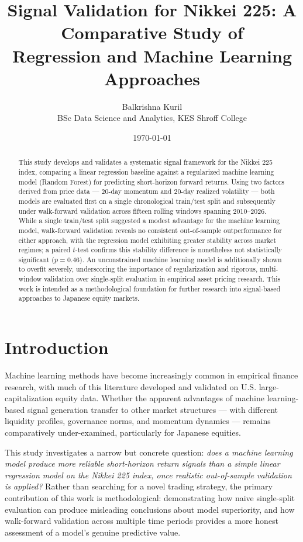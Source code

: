 \documentclass[11pt]{article}
\title{Signal Validation for Nikkei 225: A Comparative Study of \\ Regression and Machine Learning Approaches}
\author{Balkrishna Kuril \\ \small BSc Data Science and Analytics, KES Shroff College}
\date{\today}
\begin{document}
\maketitle

\begin{abstract}
This study develops and validates a systematic signal framework for the Nikkei 225 index, comparing a linear regression baseline against a regularized machine learning model (Random Forest) for predicting short-horizon forward returns. Using two factors derived from price data --- 20-day momentum and 20-day realized volatility --- both models are evaluated first on a single chronological train/test split and subsequently under walk-forward validation across fifteen rolling windows spanning 2010--2026. While a single train/test split suggested a modest advantage for the machine learning model, walk-forward validation reveals no consistent out-of-sample outperformance for either approach, with the regression model exhibiting greater stability across market regimes; a paired $t$-test confirms this stability difference is nonetheless not statistically significant ($p = 0.46$). An unconstrained machine learning model is additionally shown to overfit severely, underscoring the importance of regularization and rigorous, multi-window validation over single-split evaluation in empirical asset pricing research. This work is intended as a methodological foundation for further research into signal-based approaches to Japanese equity markets.
\end{abstract}

\section{Introduction}

Machine learning methods have become increasingly common in empirical finance research, with much of this literature developed and validated on U.S. large-capitalization equity data. Whether the apparent advantages of machine learning-based signal generation transfer to other market structures --- with different liquidity profiles, governance norms, and momentum dynamics --- remains comparatively under-examined, particularly for Japanese equities.

This study investigates a narrow but concrete question: \emph{does a machine learning model produce more reliable short-horizon return signals than a simple linear regression model on the Nikkei 225 index, once realistic out-of-sample validation is applied?} Rather than searching for a novel trading strategy, the primary contribution of this work is methodological: demonstrating how naive single-split evaluation can produce misleading conclusions about model superiority, and how walk-forward validation across multiple time periods provides a more honest assessment of a model's genuine predictive value.
\end{document}

